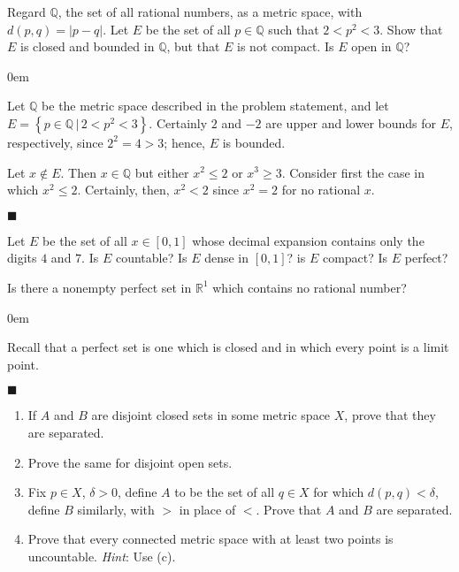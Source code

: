 \documentclass[12pt]{article}
\renewcommand{\qed}{\hfill$\blacksquare$}
\renewenvironment{proof}{\begin{addmargin}[1em]{0em}\begin{newproof}}{\end{newproof}\end{addmargin}\qed}
\newenvironment{problem}[2][Exercise]{\begin{trivlist}
\item[\hskip \labelsep {\bfseries #1}\hskip \labelsep {\bfseries #2.}]}{\end{trivlist}}
\begin{document}
\begin{problem}{2.16}
Regard $\mathbb{Q}$, the set of all rational numbers, as a metric space, with $d\left(p,q\right)=\left|p-q\right|$. Let $E$ be the set of all $p\in \mathbb{Q}$ such that $2 < p^2 < 3$. Show that $E$ is closed and bounded in $\mathbb{Q}$, but that $E$ is not compact. Is $E$ open in $\mathbb{Q}$?
\end{problem}
\begin{proof}
Let $\mathbb{Q}$ be the metric space described in the problem statement, and let $E = \left\{p\in \mathbb{Q}\,|\, 2<p^2<3\right\}$. Certainly $2$ and $-2$ are upper and lower bounds for $E$, respectively, since $2^2 =4 > 3$; hence, $E$ is bounded. 

Let $x \notin E$. Then $x\in \mathbb{Q}$ but either $x^2 \leq 2$ or $x^3 \geq 3$. Consider first the case in which $x^2 \leq 2$. Certainly, then, $x^2<2 $ since $x^2=2$ for no rational $x$. 

\end{proof}






\begin{problem}{2.17}
Let $E$ be the set of all $x\in\left[0,1\right]$ whose decimal expansion contains only the digits $4$ and $7$. Is $E$ countable? Is $E$ dense in $\left[0,1\right]$? is $E$ compact? Is $E$ perfect?
\end{problem}


\begin{problem}{2.18}
Is there a nonempty perfect set in $\mathbb{R}^1$ which contains no rational number?
\end{problem}
\begin{proof}
{\color{red}Recall that a perfect set is one which is closed and in which every point is a limit point.} 
\end{proof}




\begin{problem}{2.19}
\begin{enumerate}[label=(\alph*)]
	\item If $A$ and $B$ are disjoint closed sets in some metric space $X$, prove that they are separated.
	\item Prove the same for disjoint open sets.
	\item Fix $p\in X$, $\delta > 0$, define $A$ to be the set of all $q\in X$ for which $d\left(p,q\right)<\delta$, define $B$ similarly, with $>$ in place of $<$. Prove that $A$ and $B$ are separated.
	\item Prove that every connected metric space with at least two points is uncountable. \textit{Hint}: Use (c).
\end{enumerate}
\end{problem}
\end{document}
